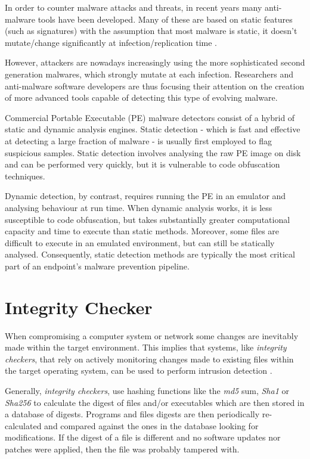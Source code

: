 \documentclass[pdfa%
,cucitura%
]{toptesi}
\begin{document}
In order to counter malware attacks and threats, in recent years many anti-malware tools have been developed. Many of these are based on static features (such as signatures) with the assumption that most malware is static, it doesn't mutate/change significantly at infection/replication time \cite{Sharma_2014}.

However, attackers are nowadays increasingly using the more sophisticated second generation malwares, which strongly mutate at each infection. Researchers and anti-malware software developers are thus focusing their attention on the creation of more advanced tools capable of detecting this type of evolving malware.

\color{Red}
Commercial Portable Executable (PE) malware detectors consist of a hybrid of static and dynamic analysis engines. Static detection - which is fast and effective at detecting a large fraction of malware - is usually first employed to flag suspicious samples. Static detection involves analysing the raw PE image on disk and can be performed very quickly, but it is vulnerable to code obfuscation techniques.

Dynamic detection, by contrast, requires running the PE in an emulator and analysing behaviour at run time. When dynamic analysis works, it is less susceptible to code obfuscation, but takes substantially greater computational capacity and time to execute than static methods. Moreover, some files are difficult to execute in an emulated environment, but can still be statically analysed. Consequently, static detection methods are typically the most critical part of an endpoint's malware prevention pipeline.
\color{Black}

\section{Integrity Checker}
When compromising a computer system or network some changes are inevitably made within the target environment. This implies that systems, like \textit{integrity checkers}, that rely on actively monitoring changes made to existing files within the target operating system, can be used to perform intrusion detection \cite{NamanyaTWM}.

Generally, \textit{integrity checkers}, use hashing functions like the \textit{md5} sum, \textit{Sha1} or \textit{Sha256} to calculate the digest of files and/or executables which are then stored in a database of digests. Programs and files digests are then periodically re-calculated and compared against the ones in the database looking for modifications. If the digest of a file is different and no software updates nor patches were applied, then the file was probably tampered with.
\end{document}
